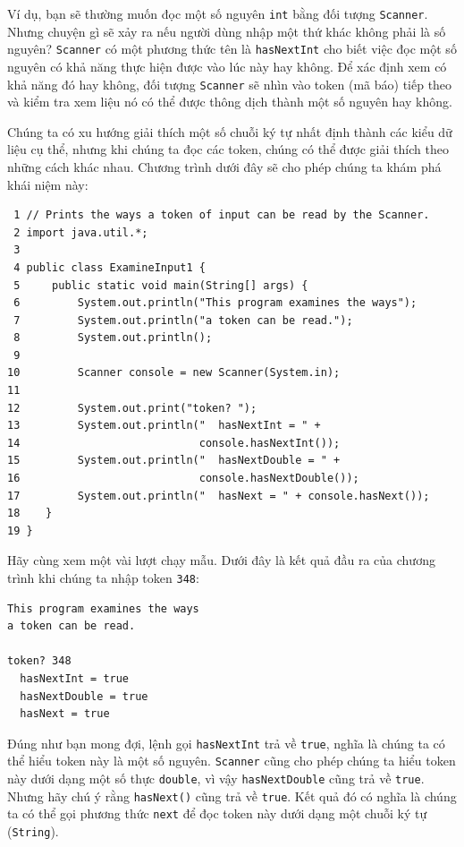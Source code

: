 Ví dụ, bạn sẽ thường muốn đọc một số nguyên \texttt{int} bằng đối tượng \texttt{Scanner}. Nhưng chuyện gì sẽ xảy ra nếu người dùng nhập một thứ khác không phải là số nguyên? \texttt{Scanner} có một phương thức tên là \texttt{hasNextInt} cho biết việc đọc một số nguyên có khả năng thực hiện được vào lúc này hay không. Để xác định xem có khả năng đó hay không, đối tượng \texttt{Scanner} sẽ nhìn vào token (mã báo) tiếp theo và kiểm tra xem liệu nó có thể được thông dịch thành một số nguyên hay không.

Chúng ta có xu hướng giải thích một số chuỗi ký tự nhất định thành các kiểu dữ liệu cụ thể, nhưng khi chúng ta đọc các token, chúng có thể được giải thích theo những cách khác nhau. Chương trình dưới đây sẽ cho phép chúng ta khám phá khái niệm này:

\begin{verbatim}
 1 // Prints the ways a token of input can be read by the Scanner.
 2 import java.util.*;
 3
 4 public class ExamineInput1 {
 5     public static void main(String[] args) {
 6         System.out.println("This program examines the ways");
 7         System.out.println("a token can be read.");
 8         System.out.println();
 9
10         Scanner console = new Scanner(System.in);
11
12         System.out.print("token? ");
13         System.out.println("  hasNextInt = " +
14                            console.hasNextInt());
15         System.out.println("  hasNextDouble = " +
16                            console.hasNextDouble());
17         System.out.println("  hasNext = " + console.hasNext());
18    }
19 }
\end{verbatim}

Hãy cùng xem một vài lượt chạy mẫu. Dưới đây là kết quả đầu ra của chương trình khi chúng ta nhập token \texttt{348}:

\begin{verbatim}
This program examines the ways 
a token can be read. 
 
token? 348 
  hasNextInt = true 
  hasNextDouble = true 
  hasNext = true 
\end{verbatim}

Đúng như bạn mong đợi, lệnh gọi \texttt{hasNextInt} trả về \texttt{true}, nghĩa là chúng ta có thể hiểu token này là một số nguyên. \texttt{Scanner} cũng cho phép chúng ta hiểu token này dưới dạng một số thực \texttt{double}, vì vậy \texttt{hasNextDouble} cũng trả về \texttt{true}. Nhưng hãy chú ý rằng \texttt{hasNext()} cũng trả về \texttt{true}. Kết quả đó có nghĩa là chúng ta có thể gọi phương thức \texttt{next} để đọc token này dưới dạng một chuỗi ký tự (\texttt{String}).

